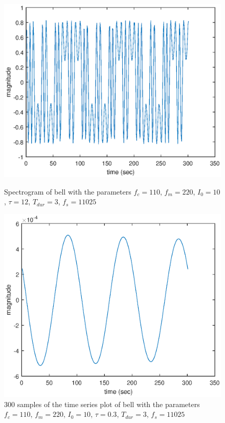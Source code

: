 \documentclass{article}
\begin{document}
\begin{figure}[H]
	\centering
	\begin{minipage}{0.3\linewidth}
		\includegraphics[scale=0.3]{samp3}
		\caption{Spectrogram of bell with the parameters $f_c = 110$, $f_m = 220$, $I_0 = 10$, $\tau = 12$, $T_{dur} = 3$, $f_s = 11025$}
	\end{minipage}
	\hspace{4cm}
	\begin{minipage}{0.3\linewidth}
		\includegraphics[scale=0.3]{samp4}
		\caption{300 samples of the time series plot of bell with the parameters $f_c = 110$, $f_m = 220$, $I_0 = 10$, $\tau = 0.3$, $T_{dur} = 3$, $f_s = 11025$}
	\end{minipage}
\end{figure}
\end{document}
